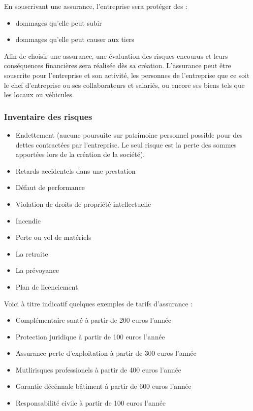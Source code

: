 \documentclass[10pt]{article}
\begin{document}
En souscrivant une assurance, l'entreprise sera protéger des :
\begin{itemize}
	\item dommages qu'elle peut subir
	\item dommages qu'elle peut causer aux tiers
\end{itemize} 

Afin de choisir une assurance, une évaluation des risques encourus et leurs conséquences financières sera réalisée dès sa création. L'assurance peut être souscrite pour l'entreprise et son activité, les personnes de l'entreprise que ce soit le chef d'entreprise ou ses collaborateurs et salariés, ou encore ses biens tels que les locaux ou véhicules.\\

\subsubsection{Inventaire des risques}
\label{ssub:inventaire_risques}
\begin{itemize}
	\item Endettement (aucune poursuite sur patrimoine personnel possible pour des dettes contractées par l'entreprise. Le seul risque est la perte des sommes apportées lors de la création de la société).
	\item Retards accidentels dans une prestation
	\item Défaut de performance
	\item Violation de droits de propriété intellectuelle
	\item Incendie
	\item Perte ou vol de matériels
	\item La retraite
	\item La prévoyance
	\item Plan de licenciement\\
\end{itemize}

Voici à titre indicatif quelques exemples de tarifs d'assurance :
\begin{itemize}
	\item Complémentaire santé à partir de 200 euros l'année
	\item Protection juridique	à partir de 100 euros l'année
	\item Assurance perte d'exploitation à partir de 300 euros l'année
	\item Mutlirisques professionels à partir de 400 euros l'année
	\item Garantie décénnale bâtiment à partir de 600 euros l'année
	\item Responsabilité civile à partir de 100 euros l'année
\end{itemize} 
\end{document}
